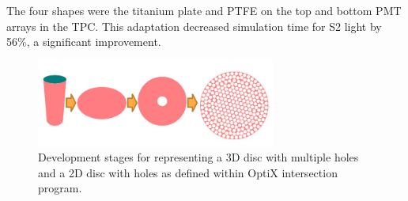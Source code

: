 The four shapes were the titanium plate and PTFE on the top and bottom PMT arrays in the TPC.
This adaptation decreased simulation time for S2 light by 56\%, a significant improvement.
\begin{figure}
\includegraphics[width=0.7\textwidth]{Figures/Simulations/opticks_PTFE_primative.png}
\centering
\caption{Development stages for representing a 3D disc with multiple holes and a 2D disc with holes as defined within OptiX intersection program.}
\label{fig:Opticks_PTFE_primative}
\end{figure}

